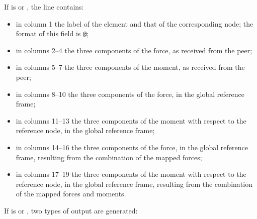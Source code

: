 If  is  or , the line contains:
\begin{itemize}
\item in column 1 the label of the element and that of the corresponding node;
	the format of this field is \texttt{@};
\item in columns 2--4 the three components of the force,
	as received from the peer;
\item in columns 5--7 the three components of the moment,
	as received from the peer;
\item in columns 8--10 the three components of the force,
	in the global reference frame;
\item in columns 11--13 the three components of the moment
	with respect to the reference node,
	in the global reference frame;
\item in columns 14--16 the three components of the force,
	in the global reference frame, resulting from the combination
	of the mapped forces;
\item in columns 17--19 the three components of the moment
	with respect to the reference node,
	in the global reference frame, resulting from the combination
	of the mapped forces and moments.
\end{itemize}
If  is  or , two types of output are generated:
